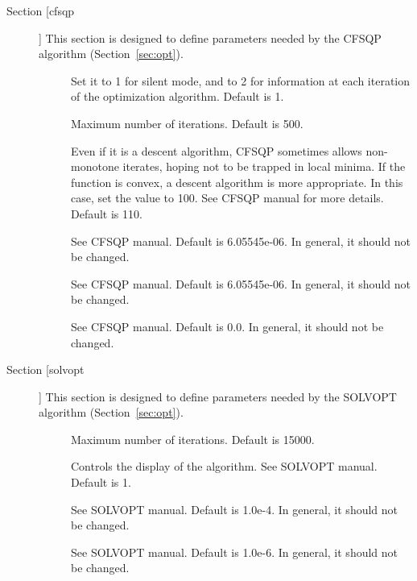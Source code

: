 \documentclass[12pt]{memoir}
\begin{document}
\begin{description}
  \item[Section [cfsqp]]
   This section is designed to define parameters needed by the
   CFSQP algorithm (Section~\ref{sec:opt}).  
   \begin{description}
      \item[] Set it to  1 for silent mode, and to 2 for
         information at each iteration of the optimization algorithm. Default is 1.
      \item[] Maximum number of iterations. Default is  500.
      \item[] Even if it is a descent algorithm, CFSQP
         sometimes allows non-monotone iterates, hoping not to be trapped in
         local minima. If the function is convex, a descent algorithm is more
         appropriate. In this case, set the value to 100. See CFSQP manual for
         more details. Default is  110.
      \item[] See CFSQP manual. Default is  6.05545e-06. In
         general, it should not be changed.
      \item[] See CFSQP manual. Default is  6.05545e-06. In
         general, it should not be changed.
      \item[] See CFSQP manual. Default is  0.0. In
         general, it should not be changed.
   \end{description}

  \item[Section [solvopt]]
   This section is designed to define parameters needed by the
   SOLVOPT algorithm (Section~\ref{sec:opt}).  
   \begin{description}
      \item[] Maximum number of iterations. Default is 15000.
      \item[]  Controls the display of the
         algorithm. See SOLVOPT manual. Default is 1.
      \item[] See SOLVOPT manual. Default is 1.0e-4. In
         general, it should not be changed.
      \item[] See SOLVOPT manual. Default is 1.0e-6. In
         general, it should not be changed.
   \end{description}


\end{description}
\end{document}
